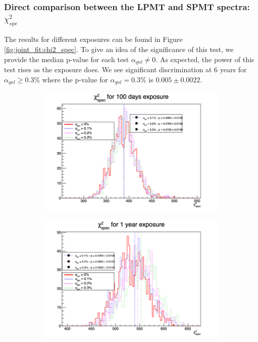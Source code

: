 \documentclass[../main.tex]{subfiles}
\begin{document}
\subsubsection{Direct comparison between the LPMT and SPMT spectra: $\chi^2_{spe}$}

The results for different exposures can be found in Figure \ref{fig:joint_fit:chi2_spec}. To give an idea of the significance of this test, we provide the median p-value for each test $\alpha_{qnl} \neq 0$. As expected, the power of this test rises as the exposure does. We see significant discrimination at 6 years for $\alpha_{qnl} \geq 0.3 \%$ where the p-value for $\alpha_{qnl} = 0.3\%$ is $0.005 \pm 0.0022$.


\begin{figure}[th]
  \centering
  \begin{subfigure}[t]{0.48\linewidth}
    \includegraphics[width=\linewidth]{images/joint_fit/stat_tests/chi2_spec_100d.png}
  \end{subfigure}
  \begin{subfigure}[t]{0.48\linewidth}
    \includegraphics[width=\linewidth]{images/joint_fit/stat_tests/chi2_spec_1y.png}
  \end{subfigure}



\end{figure}
\end{document}
